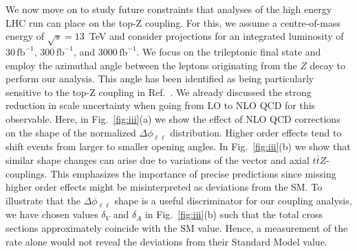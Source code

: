 \documentclass[preprint]{JHEP3} %
\def\ttbZ{t\bar{t}Z}
\def\invfb {\mathrm{fb}^{-1}}
\begin{document}
We now move on to study future constraints that analyses of the high energy LHC run can place on the top-Z coupling.
For this, we assume a centre-of-mass energy of $\sqrt{s}=13$~TeV and consider projections for an integrated luminosity of
$30\, \invfb$, $300\, \invfb$, and $3000\, \invfb$. 
We focus on the trileptonic final state and employ the azimuthal angle between the leptons originating
from the $Z$ decay to perform our analysis.
This angle has been identified as being particularly sensitive to the top-Z coupling in Ref.~\cite{baur}.
We already discussed the strong reduction in scale uncertainty when going from LO to NLO QCD for this observable.
Here, in Fig.~\ref{fig:iii}(a) we show the effect of NLO QCD corrections on the shape of the normalized $\Delta \phi_{\ell\ell}$ distribution.
Higher order effects tend to shift events from larger to smaller opening angles.
In Fig.~\ref{fig:iii}(b) we show that similar shape changes can arise due to variations of the vector and axial $\ttbZ$-couplings.
This emphasizes the importance of precise predictions since missing higher order effects might be misinterpreted as deviations from the SM.
To illustrate that the $\Delta \phi_{\ell\ell}$ shape is a useful discriminator for our coupling analysis, we have chosen 
values $\delta_V$ and $\delta_A$ in Fig.~\ref{fig:iii}(b) such that the total cross sections approximately coincide with the SM value.
Hence, a measurement of the rate alone would not reveal the deviations from their Standard Model value.
 
\end{document}
